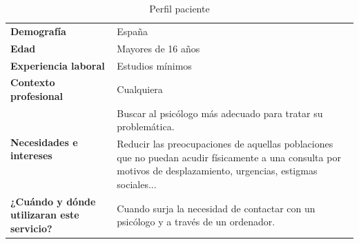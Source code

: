 \begin{table}[htpb]
\centering
\begin{tabularx}{\textwidth}{|X|X|}
\hline
\rowcolor[gray]{0.9}\multicolumn{2}{|c|}{\textbf{Pacientes}}                                                                                                                                                                               \\ \hline
\textbf{Demografía}                                & España                                                                                                                                                            \\ \hline
\textbf{Edad}                                      & Mayores de 16 años                                                                                                                                                \\ \hline
\textbf{Experiencia laboral}                       & Estudios mínimos                                                                                                                                                  \\ \hline
\textbf{Contexto profesional}                      & Cualquiera                                                                                                                                                        \\ \hline
\multirow{2}{*}{\textbf{Necesidades e intereses}}  & Buscar al psicólogo más adecuado para tratar su problemática.                                                                                                     \\ \cline{2-2} 
                                                   & Reducir las preocupaciones de aquellas poblaciones que no puedan acudir físicamente a una consulta por motivos de desplazamiento, urgencias, estigmas sociales... \\ \hline
\textbf{¿Cuándo y dónde utilizaran este servicio?} & Cuando surja la necesidad de contactar con un psicólogo y a través de un ordenador.                                                                               \\ \hline
\end{tabularx}
\caption{Perfil paciente}
\label{perf_pac}
\end{table}


